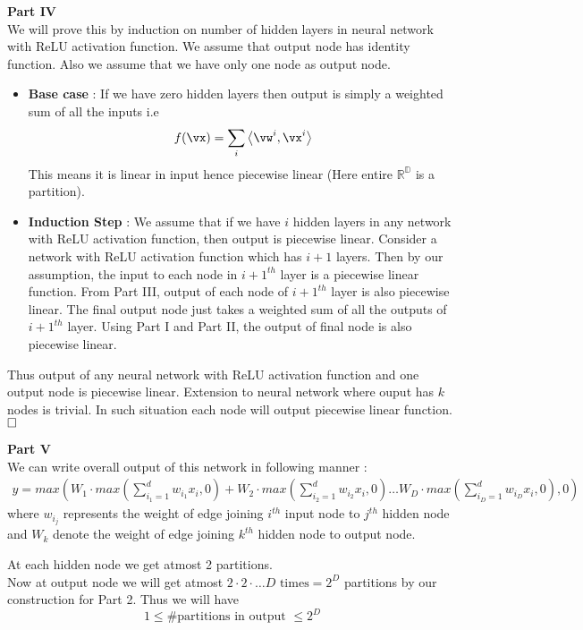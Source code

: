 \documentclass[a4paper,11pt]{article}
\begin{document}
\begin{mlsolution}
\textbf{Part IV}\\
We will prove this by induction on number of hidden layers in neural network with ReLU activation function. We assume that output node has identity function. Also we assume that we have only one node as output node.
\begin{itemize}
\item \textbf{Base case} : If we have zero hidden layers then output is simply a weighted sum of all the inputs i.e
$$f(\vx) = \sum_i \ip{\vw^i}{\vx^i}$$ This means it is linear in input hence piecewise linear (Here entire $\mathbb{R^D}$ is a partition).
\item \textbf{Induction Step} :  We assume that if we have $i$ hidden layers in any network with ReLU activation function, then output is piecewise linear. Consider a network with ReLU activation function which has $i+1$ layers. Then by our assumption, the input to each node in $i+1^{th}$ layer is a piecewise linear function. From Part III, output of each node of $i+1^{th}$ layer is also piecewise linear. The final output node just takes a weighted sum of all the outputs of $i+1^{th}$ layer. Using Part I and Part II, the output of final node is also piecewise linear.
\end{itemize}

Thus output of any neural network with ReLU activation function and one output node is piecewise linear. Extension to neural network where ouput has $k$ nodes is trivial. In such situation each node will output piecewise linear function. $ \hfill \square $

\textbf{Part V}\\
We can write overall output of this network in following manner :
\begin{align*}
y = max\left(W_1 \cdot max\left(\sum_{i_1 = 1}^d w_{i_1} x_i ,0\right) +W_2 \cdot max\left(\sum_{i_2 = 1}^d w_{i_2} x_i ,0\right) \ldots W_D \cdot max\left(\sum_{i_D = 1}^d w_{i_D} x_i ,0\right) , 0 \right)
\end{align*}
where $w_{i_j}$ represents the weight of edge joining $i^{th}$ input node to $j^{th}$ hidden node and $W_k$ denote the weight of edge joining $k^{th}$ hidden node to output node.\par
At each hidden node we get atmost 2 partitions. \\
Now at output node we will get atmost $2\cdot 2\cdot \ldots D \text{ times} = 2^D$ partitions by our construction for Part 2. Thus we will have $$1 \leq \# \text{partitions in output } \leq 2^D$$
\end{mlsolution}
\end{document}

